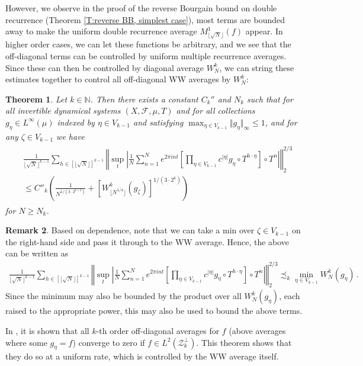 \documentclass[11pt, oneside]{amsart}   	%
\newcommand{\1}{\mathbbm{1}}
\newcommand{\N}{\mathbb{N}}
\newcommand{\floor}[1]{\lfloor#1\rfloor}
\newtheorem{theorem}{Theorem}[section]
\theoremstyle{definition}
\newtheorem{remark}[theorem]{Remark}
\begin{document}
However, we observe in the proof of the reverse Bourgain bound on double recurrence (Theorem \ref{T:reverse BB, simplest case}), most terms are bounded away to make the uniform double recurrence average $M_{\floor{\sqrt{N}}}^1(f)$ appear. In higher order cases, we can let these functions be arbitrary, and we see that the off-diagonal terms can be controlled by uniform multiple recurrence averages. Since these can then be controlled by diagonal average $W_N^k$, we can string these estimates together to control all off-diagonal WW averages by $W_N^k$:
\begin{theorem}\label{T:WW control of off-diag}
Let $k\in \N$. Then there exists a constant $C_k''$ and $N_k$ such that for all invertible dynamical systems $(X, \mathcal{F}, \mu, T)$ and  for all collections $g_\eta \in L^\infty(\mu)$ indexed by $\eta \in V_{k-1}$ and satisfying $\max_{\eta\in V_{k-1}}\Vert g_\eta \Vert_\infty \leq 1$, and for any $\zeta\in V_{k-1}$ we have
\begin{align}
\begin{split}
&\frac{1}{\floor{\sqrt{N}}^{k-1}} \sum_{h \in [\floor{\sqrt{N}}]^{k-1}} \left\Vert\sup_t \left| \frac{1}{N} \sum_{n=1}^N e^{2\pi i n t} \left[ \prod_{\eta \in V_{k-1}} c^{|\eta|} g_\eta \circ T^{h \cdot \eta}\right] \circ T^n\right| \right\Vert_2^{2/3} \\ &\leq C''_k \left(\frac{1}{N^{1/(3\cdot 2^{k+3})}} + \left[W_{\floor{N^{1/4}}}^k(g_\zeta)\right]^{1/(3\cdot 2^{k})} \right)
\end{split}
\end{align}
for $N \geq N_k$.
\end{theorem}
\begin{remark}
Based on dependence, note that we can take a min over $\zeta\in V_{k-1}$ on the right-hand side and pass it through to the WW average. Hence, the above can be written as
\begin{align*}
\frac{1}{\floor{\sqrt{N}}^{k-1}} \sum_{h \in [\floor{\sqrt{N}}]^{k-1}} \left\Vert\sup_t \left| \frac{1}{N} \sum_{n=1}^N e^{2\pi i n t} \left[ \prod_{\eta \in V_{k-1}} c^{|\eta|} g_\eta \circ T^{h \cdot \eta}\right] \circ T^n\right| \right\Vert_2^{2/3} \precsim_k \min_{\eta \in V_{k-1}} W_N^k(g_\eta) \, .
\end{align*}
Since the minimum may also be bounded by the product over all $W_N^k(g_\eta)$, each raised to the appropriate power, this may also be used to bound the above terms.
\end{remark}

In \cite[Theorem 6.3]{assani2024higherorderwienerwintnersystems}, it is shown that all $k$-th order off-diagonal averages for $f$ (above averages where some $g_\eta = f$) converge to zero if $f\in L^2(\mathcal{Z}_{k}^\perp)$. This theorem shows that they do so at a uniform rate, which is controlled by the WW average itself.
\end{document}
